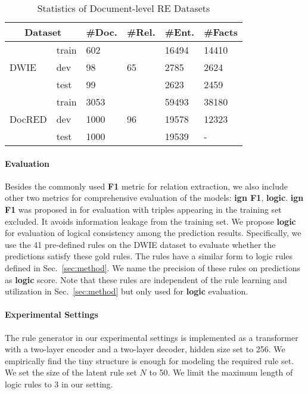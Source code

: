 \documentclass[11pt]{article}
\begin{document}
\begin{table}[t]
    \small
    \centering
    \begin{tabular}{llllll}
    \toprule
    \multicolumn{2}{c}{\bf Dataset} & \bf \#Doc. & \bf \#Rel. & \bf \#Ent. & \bf \#Facts \\ \midrule
    \multirow{3}{*}{DWIE} & train & 602 & \multirow{3}{*}{65} & 16494 & 14410  \\
    ~ & dev & 98 & ~ & 2785 & 2624 \\
    ~ & test & 99 & ~ & 2623 & 2459 \\ \midrule
    \multirow{3}{*}{DocRED} & train & 3053 & \multirow{3}{*}{96} & 59493 & 38180  \\
    ~ & dev & 1000 & ~ & 19578 & 12323 \\
    ~ & test & 1000 & ~ & 19539 & - \\ \bottomrule
    \end{tabular}
    \caption{Statistics of Document-level RE Datasets}
    \label{tab:dataset}
\end{table} 

\paragraph{Evaluation}
Besides the commonly used \textbf{F1} metric for relation extraction, we also include other two metrics for comprehensive evaluation of the models: \textbf{ign F1}, \textbf{logic}. \textbf{ign F1} was proposed in \cite{yao-etal-2019-docred} for evaluation with triples appearing in the training set excluded. It avoids information leakage from the training set. We propose \textbf{logic} for evaluation of logical consistency among the prediction results. Specifically, we use the 41 pre-defined rules on the DWIE dataset to evaluate whether the predictions satisfy these gold rules. The rules have a similar form to logic rules defined in Sec.~\ref{sec:method}. We name the precision of these rules on predictions as \textbf{logic} score. Note that these rules are independent of the rule learning and utilization in Sec.~\ref{sec:method} but only used for \textbf{logic} evaluation.

\paragraph{Experimental Settings}
The rule generator in our experimental settings is implemented as a transformer with a two-layer encoder and a two-layer decoder, hidden size set to 256. We empirically find the tiny structure is enough for modeling the required rule set. We set the size of the latent rule set $N$ to 50. We limit the maximum length of logic rules to 3 in our setting.
\end{document}
